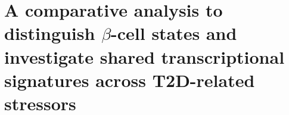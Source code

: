 
\chapter{A comparative analysis to distinguish $\beta$-cell states and investigate shared transcriptional signatures across T2D-related stressors
}
\label{chp:meta_analysis}





    


\clearpage

